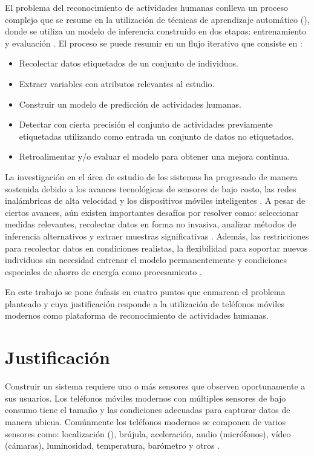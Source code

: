 El problema del reconocimiento de actividades humanas conlleva un
proceso complejo que se resume en la utilización de técnicas de aprendizaje
automático (), donde se utiliza un modelo de inferencia
construido en dos etapas: entrenamiento y evaluación \cite{LaraLabrador2013,Kwapisz2011}.
El proceso se puede resumir en un flujo iterativo que consiste en
\cite{Bao2004}:
\begin{itemize}
\item Recolectar datos etiquetados de un conjunto de individuos. 
\item Extraer variables con atributos relevantes al estudio.
\item Construir un modelo de predicción de actividades humanas.
\item Detectar con cierta precisión el conjunto de actividades previamente
etiquetadas utilizando como entrada un conjunto de datos no etiquetados.
\item Retroalimentar y/o evaluar el modelo para obtener una mejora continua.
\end{itemize}
La investigación en el área de estudio de los sistemas 
ha progresado de manera sostenida debido a los avances tecnológicas
de sensores de bajo costo, las redes inalámbricas de alta velocidad
y los dispositivos móviles inteligentes \cite{Chen2012}. A pesar
de ciertos avances, aún existen importantes desafíos por resolver
como: seleccionar medidas relevantes, recolectar datos en forma no
invasiva, analizar métodos de inferencia alternativos y extraer muestras
significativas \cite{LaraLabrador2013}. Además, las restricciones
para recolectar datos en condiciones realistas, la flexibilidad para
soportar nuevos individuos sin necesidad entrenar el modelo permanentemente
y condiciones especiales de ahorro de energía como procesamiento \cite{ReyesOrtiz2015}. 

En este trabajo se pone énfasis en cuatro puntos que enmarcan el problema
planteado y cuya justificación responde a la utilización de teléfonos
móviles modernos como plataforma de reconocimiento de actividades
humanas.

\section{Justificación}

\label{sec12:justificaciuxf3n}Construir un sistema  requiere
uno o más sensores que observen oportunamente a sus usuarios. Los
teléfonos móviles modernos con múltiples sensores de bajo consumo
tiene el tamaño y las condiciones adecuadas para capturar datos de
manera ubicua. Comúnmente los teléfonos modernos se componen de varios
sensores como: localización (), brújula, aceleración, audio
(micrófonos), vídeo (cámaras), luminosidad, temperatura, barómetro
y otros \cite{Kwapisz2011}.

